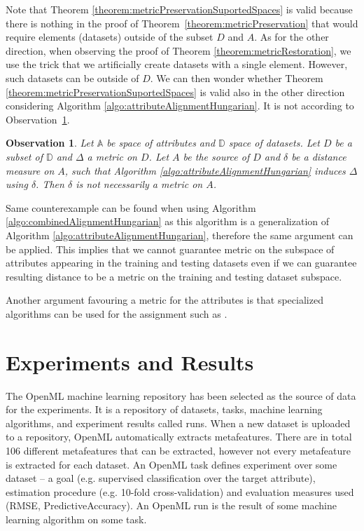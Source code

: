 \documentclass{article}
\newtheorem{observation}{Observation}
\newcommand{\attributeDistance}{\delta}
\newcommand{\globalDistance}{\Delta}
\begin{document}
\begin{refsegment}
Note that Theorem \ref{theorem:metricPreservationSuportedSpaces} is valid because there is nothing in the proof of Theorem~\ref{theorem:metricPreservation} that would require elements (datasets) outside of the subset $D$ and $A$. As for the other direction,  when observing the proof of Theorem \ref{theorem:metricRestoration}, we use the trick that we artificially create datasets with a single element. However, such datasets can be outside of $D$. We can then wonder whether Theorem \ref{theorem:metricPreservationSuportedSpaces} is valid also in the other direction considering  Algorithm \ref{algo:attributeAlignmentHungarian}. It is not according to Observation~\ref{theorem:metricNonRestorationSupportedSpaces}.

\begin{observation}
	\label{theorem:metricNonRestorationSupportedSpaces}
	Let $\mathbb{A}$ be space of attributes and $\mathbb{D}$ space of datasets. Let $D$ be a subset of $\mathbb{D}$ and $\globalDistance$ a metric on $D$. Let $A$ be the source of $D$ and $\attributeDistance$ be a distance measure on $A$, such that Algorithm \ref{algo:attributeAlignmentHungarian} induces $\globalDistance$ using $\attributeDistance$. Then $\attributeDistance$ is not necessarily a metric on $A$.
\end{observation}

Same counterexample can be found when using Algorithm \ref{algo:combinedAlignmentHungarian} as this algorithm is a generalization of Algorithm \ref{algo:attributeAlignmentHungarian}, therefore the same argument can be applied. 
This implies that we cannot guarantee metric on the subspace of attributes appearing in the training and testing datasets even if we can guarantee resulting distance to be a metric on the training and testing dataset subspace.

Another argument favouring a metric for the attributes is that specialized algorithms can be used for the assignment such as \cite{AgarwalApproximateBipartiteMatchingForMetric}.

\section{Experiments and Results}

The OpenML \cite{openMl} machine learning repository has been selected as the source of data for the experiments. It is a repository of datasets, tasks, machine learning algorithms, and experiment results called runs. When a new dataset is uploaded to a repository, OpenML automatically extracts metafeatures. There are in total 106 different metafeatures that can be extracted, however not every metafeature is extracted for each dataset. An OpenML task defines experiment over some dataset -- a goal (e.g. supervised classification over the target attribute), estimation procedure (e.g. 10-fold cross-validation) and evaluation measures used (RMSE, PredictiveAccuracy). An OpenML run is the result of some machine learning algorithm on some task. 


\end{refsegment}
\end{document}
